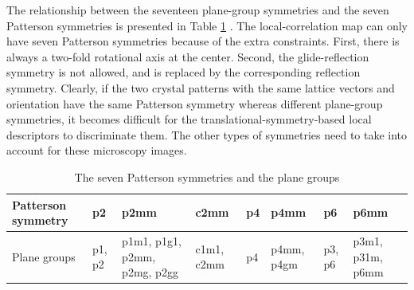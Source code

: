 \documentclass[twocolumn,amsmath, floatfix]{revtex4}
\begin{document}
The relationship between the seventeen plane-group symmetries and the seven Patterson symmetries is presented in Table \ref{Patterson_symmetries} \cite{ITA2002}. The local-correlation map can only have seven Patterson symmetries because of the extra constraints. First, there is always a two-fold rotational axis at the center. Second, the glide-reflection symmetry is not allowed, and is replaced by the corresponding reflection symmetry. Clearly, if the two crystal patterns with the same lattice vectors and orientation have the same Patterson symmetry whereas different plane-group symmetries, it becomes difficult for the translational-symmetry-based local descriptors to discriminate them.  The other types of symmetries need to take into account for these microscopy images. 


\begin{table}[ht]
\centering
\captionsetup{width=1\textwidth}
\caption{The seven Patterson symmetries and  the plane groups \cite{ITA2002}}
\label{Patterson_symmetries}
\begin{tabular}{ |p{3cm}|p{1cm}|p{1cm}|p{1cm}|p{1cm}|p{1cm}|p{1cm}|p{1cm}| }
\hline
 Patterson symmetry & p2 & p2mm & c2mm & p4 & p4mm & p6 & p6mm \\ 
\hline
 Plane groups & p1,  p2 & p1m1, p1g1, p2mm, p2mg, p2gg & c1m1, c2mm  & p4 & p4mm, p4gm & p3, p6 & p3m1, p31m, p6mm\\
 \hline
 
 
 \hline
 \end{tabular}
\end{table}

\end{document}
